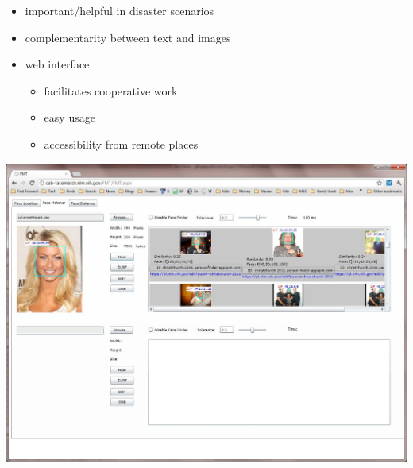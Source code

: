 
\begin{xpsectionbox}{}{}

\begin{minipage}{0.4\linewidth}
\begin{itemize}
	\item important/helpful in disaster scenarios
	\item complementarity between text and images
	\item web interface
		\begin{itemize}
			\item facilitates cooperative work
			\item easy usage
			\item accessibility from remote places
		\end{itemize}
\end{itemize}
\end{minipage}
\begin{minipage}{0.6\linewidth}
\begin{center}
	\includegraphics[height=0.5\linewidth]{images/web_interface}
\end{center}
\end{minipage}


\end{xpsectionbox}
